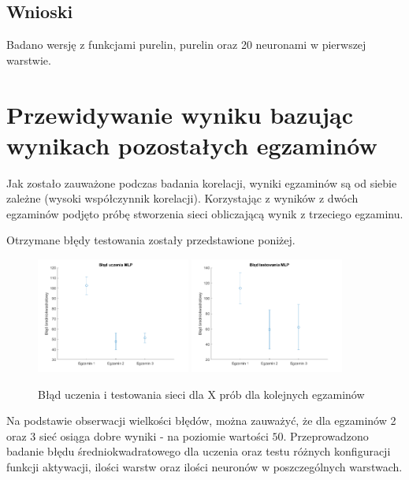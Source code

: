 \documentclass[12pt]{article}
\begin{document}
\subsection{Wnioski}
Badano wersję z funkcjami purelin, purelin oraz 20 neuronami w pierwszej warstwie.

\pagebreak
\section{Przewidywanie wyniku bazując wynikach pozostałych egzaminów} %
Jak zostało zauważone podczas badania korelacji, wyniki egzaminów są od siebie zależne (wysoki współczynnik korelacji). Korzystając z wyników z dwóch egzaminów podjęto próbę stworzenia sieci obliczającą wynik z trzeciego egzaminu.

Otrzymane błędy testowania zostały przedstawione poniżej.

\begin{figure}[H]
\centering
\includegraphics[width=0.45\textwidth]{cz3_egz_ucz.png}
\includegraphics[width=0.45\textwidth]{cz3_egz_test.png}
\caption{Błąd uczenia i testowania sieci dla X prób dla kolejnych egzaminów}
\end{figure}

Na podstawie obserwacji wielkości błędów, można zauważyć, że dla egzaminów 2 oraz 3 sieć osiąga dobre wyniki - na poziomie wartości $50$.  Przeprowadzono badanie błędu średniokwadratowego dla uczenia oraz testu różnych konfiguracji funkcji aktywacji, ilości warstw oraz ilości neuronów w poszczególnych warstwach.
\end{document}
